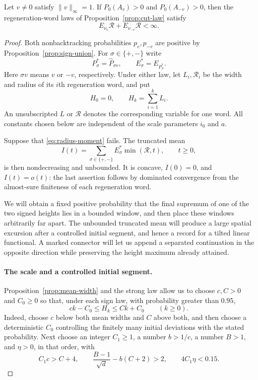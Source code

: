 \begin{proposition}
\label{prop:radius-moment}
Let $v\ne0$ satisfy $\|v\|_\infty=1$.  If
$P_0(A_v)>0$ and $P_0(A_{-v})>0$, then the regeneration-word laws of
Proposition~\ref{prop:cut-law} satisfy
\begin{equation}
  E_{\nu_v}\mathcal R+E_{\nu_{-v}}\mathcal R<\infty.
  \label{eq:radius-moment}
\end{equation}
\end{proposition}

\begin{proof}
Both nonbacktracking probabilities $p_v,p_{-v}$ are positive by
Proposition~\ref{prop:sign-union}.  For $\sigma\in\{+,-\}$ write
\[
  P_\sigma^*=\widehat P_{\sigma v},\qquad
  E_\sigma^*=E_{P_\sigma^*}.
\]
Here $\sigma v$ means $v$ or $-v$, respectively.  Under either law, let
$L_i,\mathcal R_i$ be the width and radius of its $i$th regeneration
word, and put
\[
  H_0=0,\qquad H_k=\sum_{i=1}^k L_i.
\]
An unsubscripted $L$ or $\mathcal R$ denotes the corresponding variable
for one word.  All constants chosen below are independent of the scale
parameters $i_0$ and $a$.

Suppose that \eqref{eq:radius-moment} fails.  The truncated mean
\[
  I(t)=\sum_{\sigma\in\{+,-\}}E_\sigma^*\min(\mathcal R,t),
  \qquad t\ge0,
\]
is then nondecreasing and unbounded.  It is concave, $I(0)=0$, and
$I(t)=o(t)$: the last assertion follows by dominated convergence from
the almost-sure finiteness of each regeneration word.

We will obtain a fixed positive probability that the final supremum of
one of the two signed heights lies in a bounded window, and then place
these windows arbitrarily far apart.  The unbounded truncated mean
will produce a large spatial excursion after a controlled initial
segment, and hence a record for a tilted linear functional.  A marked
connector will let us append a separated continuation in the opposite
direction while preserving the height maximum already attained.

\paragraph{The scale and a controlled initial segment.}
Proposition~\ref{prop:mean-width} and the strong law allow us to choose
$c,C>0$ and $C_0\ge0$ so that, under each sign law, with probability
greater than $0.95$,
\begin{equation}
  ck-C_0\le H_k\le Ck+C_0\qquad(k\ge0).
  \label{eq:radius-height-bounds}
\end{equation}
Indeed, choose $c$ below both mean widths and $C$ above both, and then
choose a deterministic $C_0$ controlling the finitely many initial
deviations with the stated probability.  Next choose an integer
$C_1\ge1$, a number $b>1/c$, a number $B>1$, and $\eta>0$, in that
order, with
\begin{equation}
  C_1c>C+4,\qquad
  \frac{B-1}{\sqrt d}-b(C+2)>2,\qquad
  4C_1\eta<0.15.
  \label{eq:radius-constants}
\end{equation}


\end{proof}
